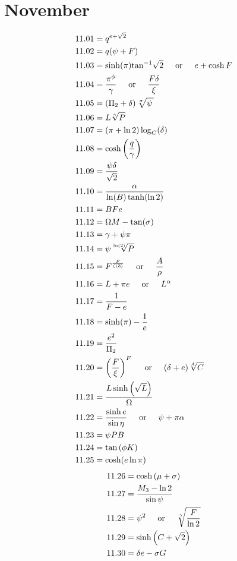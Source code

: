 \documentclass[12pt]{article}
\newcommand{\atan}{\text{tan}^{-1}}
\newcommand{\oder}{\hspace{5mm}\text{or}\hspace{5mm}}
\begin{document}
\pagebreak
 
\section{November}
\begin{align*}
11.01 &= q^{e + \sqrt{2}}\\
11.02 &= q (\psi + F)\\
11.03 &= \sinh(\pi)\atan\sqrt{2} \oder e+\cosh{F}\\
11.04 &= \frac{\pi^{\phi}}{\gamma} \oder \frac{F \delta}{\xi}\\
11.05 &= \left(\Pi_{2} + \delta\right) \sqrt[\sigma]{\psi\,}\\
11.06 &= L \sqrt[\gamma]{P}\\
11.07 &= (\pi+\ln 2)\log_{C}(\delta)\\
11.08 &= \cosh\left(\frac{q}{\gamma}\right)\\
11.09 &= \frac{\psi \delta}{\sqrt{2}}\\
11.10 &= \frac{\alpha}{\ln(B)\tanh(\ln 2)}\\
11.11 &= BFe\\
11.12 &= \Omega M-\tan(\sigma)\\
11.13 &= \gamma+\psi \pi\\
11.14 &= \psi \sqrt[\ln(2)]{P}\\
11.15 &= F^{\frac{F}{\zeta(3)}} \oder \frac{A}{\rho}\\
11.16 &= L + \pi e \oder L^{\alpha}\\
11.17 &= \frac{1}{F-e}\\
11.18 &= \sinh(\pi)-\frac{1}{e}\\
11.19 &= \frac{e^{2}}{\Pi_{2}}\\
11.20 &= \left(\frac{F}{\xi}\right)^{F} \oder (\delta+e)\sqrt[A]{C} \\
11.21 &= \frac{L \sinh\left(\sqrt{L}\right)}{\Omega}\\
11.22 &= \frac{\sinh e}{\sin\eta} \oder \psi + \pi\alpha\\
11.23 &= \psi P B\\
11.24 &= \tan\left(\phi K\right)\\
11.25 &= \cosh(e \ln \pi)\\
\end{align*}
\begin{align*}
11.26 &= \cosh\left(\mu+\sigma\right)\\
11.27 &= \frac{M_{3}-\ln 2}{\sin\psi}\\
11.28 &= \psi^{2} \oder \sqrt[\gamma]{\frac{F}{\ln 2}}\\
11.29 &= \sinh\left(C+\sqrt{2}\right)\\
11.30 &= \delta e-\sigma G\\
\end{align*}
\end{document}
